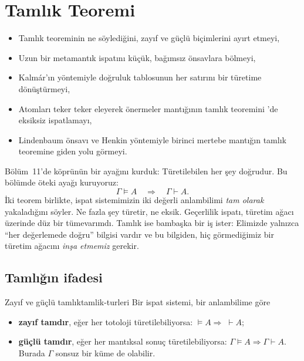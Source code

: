 \chapter{Tamlık Teoremi}\label{bol:tamlik}

\begin{bolumhedefleri}
\begin{itemize}
  \item Tamlık teoreminin ne söylediğini, zayıf ve güçlü biçimlerini
        ayırt etmeyi,
  \item Uzun bir metamantık ispatını küçük, bağımsız önsavlara bölmeyi,
  \item Kalmár'ın yöntemiyle doğruluk tablosunun her satırını bir
        türetime dönüştürmeyi,
  \item Atomları teker teker eleyerek önermeler mantığının tamlık
        teoremini \Lean{}'de eksiksiz ispatlamayı,
  \item Lindenbaum önsavı ve Henkin yöntemiyle birinci mertebe mantığın
        tamlık teoremine giden yolu görmeyi.
\end{itemize}
\end{bolumhedefleri}

Bölüm~11'de köprünün bir ayağını kurduk: Türetilebilen her şey
doğrudur. Bu bölümde öteki ayağı kuruyoruz:
\[
  \Gamma \models A \quad\Longrightarrow\quad \Gamma \vdash A.
\]
İki teorem birlikte, ispat sistemimizin iki değerli anlambilimi
\emph{tam olarak} yakaladığını söyler. Ne fazla şey türetir, ne eksik.
Geçerlilik ispatı, türetim ağacı üzerinde düz bir tümevarımdı. Tamlık
ise bambaşka bir iş ister: Elimizde yalnızca ``her değerlemede doğru''
bilgisi vardır ve bu bilgiden, hiç görmediğimiz bir türetim ağacını
\emph{inşa etmemiz} gerekir.

\section{Tamlığın ifadesi}\label{sec:tamlik-ifade}

\begin{tanim}{Zayıf ve güçlü tamlık}{tamlik-turleri}
Bir ispat sistemi, bir anlambilime göre
\begin{itemize}
  \item \textbf{zayıf tamdır}, eğer her totoloji türetilebiliyorsa:
        $\models A \Rightarrow\; \vdash A$;
  \item \textbf{güçlü tamdır}, eğer her mantıksal sonuç
        türetilebiliyorsa: $\Gamma \models A \Rightarrow \Gamma \vdash
        A$. Burada $\Gamma$ sonsuz bir küme de olabilir.
\end{itemize}
\end{tanim}

